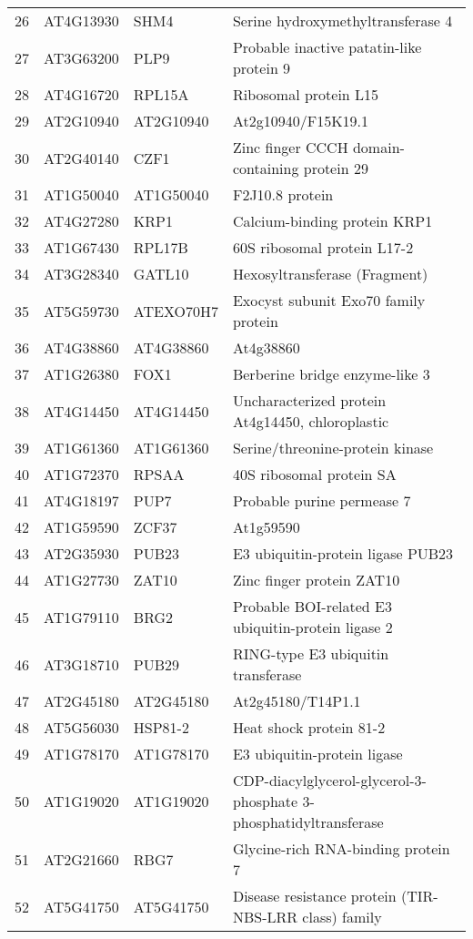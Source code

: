 \documentclass[a4paper]{article}
\begin{document}
\begin{center}
\begin{tabular}{rlll}
26 & AT4G13930 & SHM4 & Serine hydroxymethyltransferase 4\\
27 & AT3G63200 & PLP9 & Probable inactive patatin-like protein 9\\
28 & AT4G16720 & RPL15A & Ribosomal protein L15\\
29 & AT2G10940 & AT2G10940 & At2g10940/F15K19.1\\
30 & AT2G40140 & CZF1 & Zinc finger CCCH domain-containing protein 29\\
31 & AT1G50040 & AT1G50040 & F2J10.8 protein\\
32 & AT4G27280 & KRP1 & Calcium-binding protein KRP1\\
33 & AT1G67430 & RPL17B & 60S ribosomal protein L17-2\\
34 & AT3G28340 & GATL10 & Hexosyltransferase (Fragment)\\
35 & AT5G59730 & ATEXO70H7 & Exocyst subunit Exo70 family protein\\
36 & AT4G38860 & AT4G38860 & At4g38860\\
37 & AT1G26380 & FOX1 & Berberine bridge enzyme-like 3\\
38 & AT4G14450 & AT4G14450 & Uncharacterized protein At4g14450, chloroplastic\\
39 & AT1G61360 & AT1G61360 & Serine/threonine-protein kinase\\
40 & AT1G72370 & RPSAA & 40S ribosomal protein SA\\
41 & AT4G18197 & PUP7 & Probable purine permease 7\\
42 & AT1G59590 & ZCF37 & At1g59590\\
43 & AT2G35930 & PUB23 & E3 ubiquitin-protein ligase PUB23\\
44 & AT1G27730 & ZAT10 & Zinc finger protein ZAT10\\
45 & AT1G79110 & BRG2 & Probable BOI-related E3 ubiquitin-protein ligase 2\\
46 & AT3G18710 & PUB29 & RING-type E3 ubiquitin transferase\\
47 & AT2G45180 & AT2G45180 & At2g45180/T14P1.1\\
48 & AT5G56030 & HSP81-2 & Heat shock protein 81-2\\
49 & AT1G78170 & AT1G78170 & E3 ubiquitin-protein ligase\\
50 & AT1G19020 & AT1G19020 & CDP-diacylglycerol-glycerol-3-phosphate 3-phosphatidyltransferase\\
51 & AT2G21660 & RBG7 & Glycine-rich RNA-binding protein 7\\
52 & AT5G41750 & AT5G41750 & Disease resistance protein (TIR-NBS-LRR class) family\\

\end{tabular}
\end{center}
\end{document}

